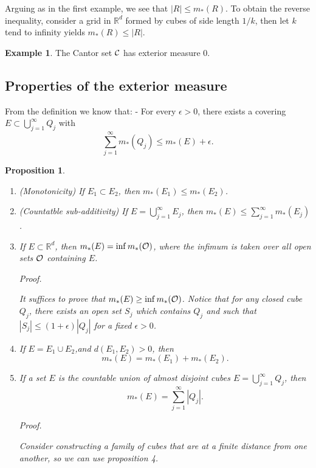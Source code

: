 \documentclass[
]{book}
\providecommand{\tightlist}{%
  \setlength{\itemsep}{0pt}\setlength{\parskip}{0pt}}
\newtheorem{proposition}{Proposition}[chapter]
\theoremstyle{definition}
\theoremstyle{definition}
\newtheorem{example}{Example}[chapter]
\theoremstyle{definition}
\theoremstyle{definition}
\theoremstyle{remark}
\begin{document}
Arguing as in the first example, we see that \(|R|\leq m_{\ast}(R)\). To obtain the reverse inequality, consider a grid in \(\mathbb{R}^d\) formed by cubes of side length \(1/k\), then let \(k\) tend to infinity yields \(m_{\ast}(R)\leq |R|\).

\begin{example}
The Cantor set \(\cal C\) has exterior measure 0.
\end{example}

\subsection{Properties of the exterior measure}\label{properties-of-the-exterior-measure}

From the definition we know that:
- For every \(\epsilon>0\), there exists a covering \(E\subset \bigcup_{j=1}^{\infty}Q_j\) with
\[
\sum_{j=1}^{\infty}m_{\ast}(Q_j)\leq m_{\ast}(E)+\epsilon.
\]

\begin{proposition}
\protect\hypertarget{prp:pem}{}\label{prp:pem}\leavevmode

\begin{enumerate}
\def\labelenumi{\arabic{enumi}.}
\tightlist
\item
  (Monotonicity) If \(E_1\subset E_2\), then \(m_{\ast}(E_1)\leq m_{\ast}(E_2)\).
\item
  (Countatble sub-additivity) If \(E= \bigcup_{j=1}^{\infty}E_j\), then \(m_{\ast}(E)\leq\sum_{j=1}^{\infty}m_{\ast}(E_j)\).
\item
  If \(E\subset\mathbb{R}^d\), then \(m_{\ast}(E)=\inf m_{\ast}(\cal O)\), where the infimum is taken over all open sets \(\cal O\) containing \(E\).

  \emph{Proof.}

  It suffices to prove that \(m_{\ast}(E)\geq \inf m_{\ast}(\cal O)\). Notice that for any closed cube \(Q_j\), there exists an open set \(S_j\) which contains \(Q_j\) and such that \(|S_j|\leq (1+\epsilon)|Q_j|\) for a fixed \(\epsilon>0\).
\item
  If \(E=E_1\cup E_2\),and \(d(E_1,E_2)>0\), then
  \[
   m_{\ast}(E)=  m_{\ast}(E_1)+  m_{\ast}(E_2).
  \]
\item
  If a set \(E\) is the countable union of almost disjoint cubes \(E=\bigcup_{j=1}^{\infty}Q_j\), then
  \[
  m_{\ast}(E) = \sum_{j=1}^{\infty}|Q_j|.
  \]

  \emph{Proof.}

  Consider constructing a family of cubes that are at a finite distance from one another, so we can use proposition 4.
\end{enumerate}

\end{proposition}
\end{document}
